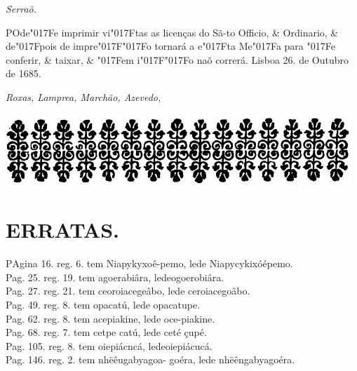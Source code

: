 \documentclass[openany,titlepage,12pt]{book}
\renewcommand{\chaptermark}[1]{\markboth{#1}{}}
\renewcommand{\sectionmark}[1]{\gdef\rightmark{#1}}
\newcommand{\lgS}{\char"017F}
\newcommand{\lgSS}{\char"017F\char"017F}
\begin{document}
\begin{center}
    \hspace{60pt}\textit{Serraõ.}
\end{center}

\lettrine[findent=2pt, nindent=0pt, lines=2]
{P}{O}de\lgS e imprimir vi\lgS tas as licenças do Sã-to
Officio, \& Ordinario, \& de\lgS pois de impre\lgSS o tornará a
e\lgS ta Me\lgS a para \lgS e conferir, \& taixar, \& \lgS em 
i\lgSS o naõ correrá.
Lisboa 26. de Outubro de 1685.
\begin{center}
    \hspace{0pt}\textit{Roxas, Lamprea, Marchão, Azevedo,}
\end{center}
\newpage

\begin{center}
    \vspace*{40pt}
    \includegraphics[scale=0.33]{07.erratas.png}
\end{center}
\unskip
\vspace*{-30pt}
{\let\clearpage\relax \chapter{ERRATAS.}}
\chaptermark{}
\sectionmark{}
\lettrine[findent=2pt, nindent=0pt, lines=2]
{P}{A}gina 16. reg. 6. tem Niapykyxoê-\linebreak pemo, lede 
Niapycykixóépemo.\\
Pag. 25. reg. 19. tem agoerabiâra, lede\linebreak ogoerobiâra.\\
Pag. 27. reg. 21. tem ceoroiacegeâbo, lede ceroiacegoâbo.\\
Pag. 49. reg. 8. tem opacatú, lede opacatupe.\\
Pag. 62. reg. 8. tem acepiakine, lede oce-piakine.\\
Pag. 68. reg. 7. tem cetpe catú, lede ceté çupé.\\
Pag. 105. reg. 8. tem oiepiácncá, lede\linebreak oiepiácucá.\\
Pag. 146. reg. 2. tem nhëêugabyagoa-\linebreak
goéra, lede nhëêngabyagoéra.\\
\end{document}
